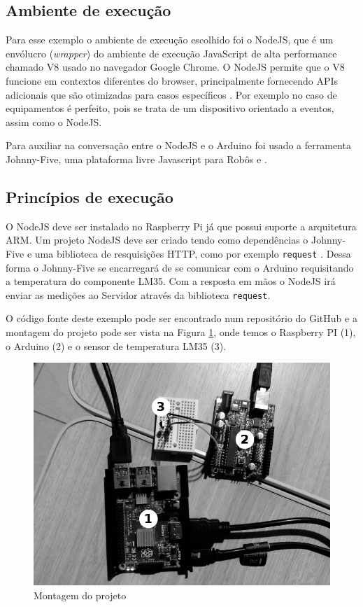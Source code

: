 \subsection{Ambiente de execução}\label{ambiente-de-execuuxe7uxe3o}

Para esse exemplo o ambiente de execução escolhido foi o NodeJS, que é
um envólucro (\emph{wrapper}) do ambiente de execução JavaScript de alta
performance chamado V8 usado no navegador Google Chrome. O NodeJS
permite que o V8 funcione em contextos diferentes do browser,
principalmente fornecendo APIs adicionais que são otimizadas para casos
específicos \cite{hughes-croucher:2012}. Por exemplo no caso de
equipamentos \iot é perfeito, pois se trata de um dispositivo orientado
a eventos, assim como o NodeJS.

Para auxiliar na conversação entre o NodeJS e o Arduino foi usado a
ferramenta Johnny-Five, uma plataforma livre Javascript para Robôs e
\iot \cite{johnny-five:2012}.

\subsection{Princípios de
execução}\label{princuxedpios-de-execuuxe7uxe3o}

O NodeJS deve ser instalado no Raspberry Pi já que possui suporte a
arquitetura ARM. Um projeto NodeJS deve ser criado tendo como
dependências o Johnny-Five e uma biblioteca de resquisições HTTP, como
por exemplo \texttt{request} \cite{request:2016}. Dessa forma o
Johnny-Five se encarregará de se comunicar com o Arduino requisitando a
temperatura do componente LM35. Com a resposta em mãos o NodeJS irá
enviar as medições ao Servidor através da biblioteca \texttt{request}.

O código fonte deste exemplo pode ser encontrado num repositório do
GitHub \cite{alves:2016} e a montagem do projeto pode ser vista na
Figura \ref{fig:montagem}, onde temos o Raspberry PI (1), o Arduino (2)
e o sensor de temperatura LM35 (3).

\begin{figure}[h]
    \centering
    \includegraphics[scale=0.3]{img/montagem-grey.jpg}
    \caption{Montagem do projeto} \label{fig:montagem}
\end{figure}


